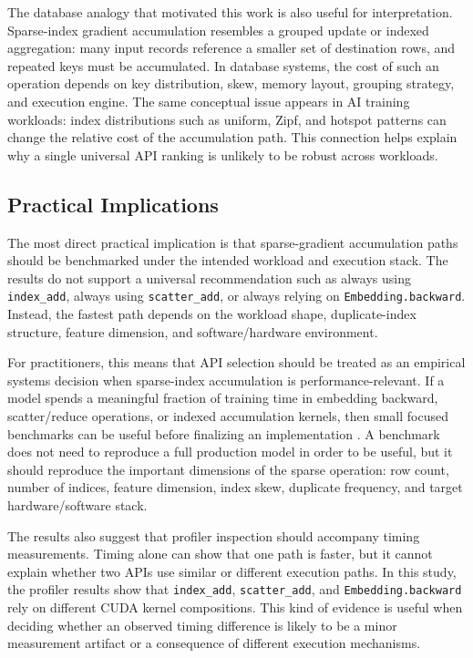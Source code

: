 The database analogy that motivated this work is also useful for interpretation. Sparse-index gradient accumulation resembles a grouped update or indexed aggregation: many input records reference a smaller set of destination rows, and repeated keys must be accumulated. In database systems, the cost of such an operation depends on key distribution, skew, memory layout, grouping strategy, and execution engine. The same conceptual issue appears in AI training workloads: index distributions such as uniform, Zipf, and hotspot patterns can change the relative cost of the accumulation path. This connection helps explain why a single universal API ranking is unlikely to be robust across workloads.

\subsection{Practical Implications}

The most direct practical implication is that sparse-gradient accumulation paths should be benchmarked under the intended workload and execution stack. The results do not support a universal recommendation such as always using \texttt{index\_add}, always using \texttt{scatter\_add}, or always relying on \texttt{Embedding.backward}. Instead, the fastest path depends on the workload shape, duplicate-index structure, feature dimension, and software/hardware environment.

For practitioners, this means that API selection should be treated as an empirical systems decision when sparse-index accumulation is performance-relevant. If a model spends a meaningful fraction of training time in embedding backward, scatter/reduce operations, or indexed accumulation kernels, then small focused benchmarks can be useful before finalizing an implementation \cite{pytorchStableEmbedding,pytorchStableIndexAdd,pytorchStableScatterAdd}. A benchmark does not need to reproduce a full production model in order to be useful, but it should reproduce the important dimensions of the sparse operation: row count, number of indices, feature dimension, index skew, duplicate frequency, and target hardware/software stack.

The results also suggest that profiler inspection should accompany timing measurements. Timing alone can show that one path is faster, but it cannot explain whether two APIs use similar or different execution paths. In this study, the profiler results show that \texttt{index\_add}, \texttt{scatter\_add}, and \texttt{Embedding.backward} rely on different CUDA kernel compositions. This kind of evidence is useful when deciding whether an observed timing difference is likely to be a minor measurement artifact or a consequence of different execution mechanisms.

